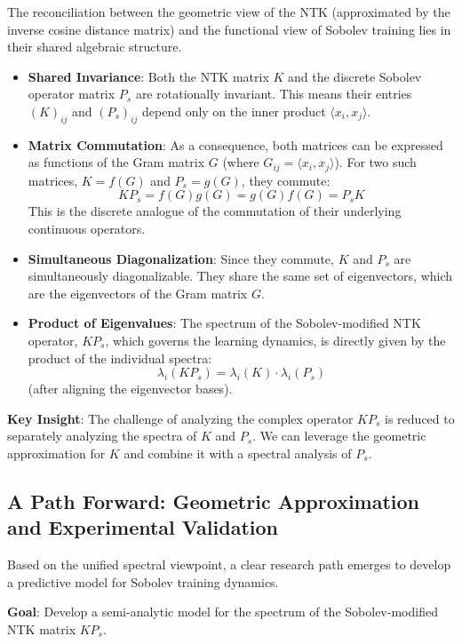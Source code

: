 \documentclass[a4paper]{article}
\begin{document}
The reconciliation between the geometric view of the NTK (approximated by the inverse cosine distance matrix) and the functional view of Sobolev training lies in their shared algebraic structure.

\begin{itemize}
    \item \textbf{Shared Invariance}: Both the NTK matrix $K$ and the discrete Sobolev operator matrix $P_s$ are rotationally invariant. This means their entries $(K)_{ij}$ and $(P_s)_{ij}$ depend only on the inner product $\langle x_i, x_j \rangle$.
    
    \item \textbf{Matrix Commutation}: As a consequence, both matrices can be expressed as functions of the Gram matrix $G$ (where $G_{ij} = \langle x_i, x_j \rangle$). For two such matrices, $K=f(G)$ and $P_s=g(G)$, they commute:
    \[ K P_s = f(G)g(G) = g(G)f(G) = P_s K \]
    This is the discrete analogue of the commutation of their underlying continuous operators.
    
    \item \textbf{Simultaneous Diagonalization}: Since they commute, $K$ and $P_s$ are simultaneously diagonalizable. They share the same set of eigenvectors, which are the eigenvectors of the Gram matrix $G$.
    
    \item \textbf{Product of Eigenvalues}: The spectrum of the Sobolev-modified NTK operator, $K P_s$, which governs the learning dynamics, is directly given by the product of the individual spectra:
    \[ \lambda_i(K P_s) = \lambda_i(K) \cdot \lambda_i(P_s) \]
    (after aligning the eigenvector bases).
\end{itemize}

\textbf{Key Insight}: The challenge of analyzing the complex operator $K P_s$ is reduced to separately analyzing the spectra of $K$ and $P_s$. We can leverage the geometric approximation for $K$ and combine it with a spectral analysis of $P_s$.

\subsection{A Path Forward: Geometric Approximation and Experimental Validation}

Based on the unified spectral viewpoint, a clear research path emerges to develop a predictive model for Sobolev training dynamics.

\textbf{Goal}: Develop a semi-analytic model for the spectrum of the Sobolev-modified NTK matrix $K P_s$.
\end{document}
